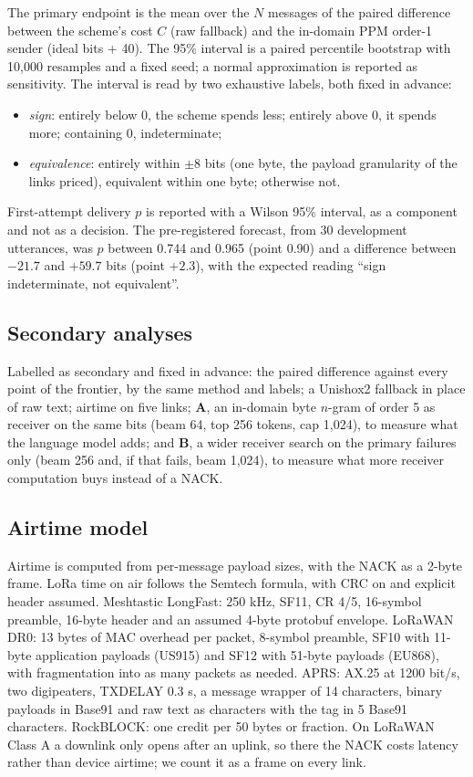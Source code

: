\documentclass[11pt]{article}
\begin{document}
The primary endpoint is the mean over the $N$ messages of the paired difference between the scheme's
cost $C$ (raw fallback) and the in-domain PPM order-1 sender (ideal bits + 40). The 95\% interval is
a paired percentile bootstrap with 10,000 resamples and a fixed seed; a normal approximation is
reported as sensitivity. The interval is read by two exhaustive labels, both fixed in advance:
\begin{itemize}
\item \emph{sign}: entirely below 0, the scheme spends less; entirely above 0, it spends more;
containing 0, indeterminate;
\item \emph{equivalence}: entirely within $\pm 8$ bits (one byte, the payload granularity of the
links priced), equivalent within one byte; otherwise not.
\end{itemize}
First-attempt delivery $p$ is reported with a Wilson 95\% interval, as a component and not as a
decision. The pre-registered forecast, from 30 development utterances, was $p$ between 0.744 and
0.965 (point 0.90) and a difference between $-21.7$ and $+59.7$ bits (point $+2.3$), with the
expected reading ``sign indeterminate, not equivalent''.

\subsection{Secondary analyses}\label{sec:secondary}

Labelled as secondary and fixed in advance: the paired difference against every point of the
frontier, by the same method and labels; a Unishox2 fallback in place of raw text; airtime on five
links; \textbf{A}, an in-domain byte $n$-gram of order 5 as receiver on the same bits (beam 64, top 256
tokens, cap 1,024), to measure what the language model adds; and \textbf{B}, a wider receiver search
on the primary failures only (beam 256 and, if that fails, beam 1,024), to measure what more receiver
computation buys instead of a NACK.

\subsection{Airtime model}

Airtime is computed from per-message payload sizes, with the NACK as a 2-byte frame. LoRa time on air
follows the Semtech formula, with CRC on and explicit header assumed. Meshtastic LongFast: 250 kHz,
SF11, CR 4/5, 16-symbol preamble, 16-byte header and an assumed 4-byte protobuf envelope. LoRaWAN DR0:
13 bytes of MAC overhead per packet, 8-symbol preamble, SF10 with 11-byte application payloads
(US915) and SF12 with 51-byte payloads (EU868), with fragmentation into as many packets as needed.
APRS: AX.25 at 1200 bit/s, two digipeaters, TXDELAY 0.3 s, a message wrapper of 14 characters, binary
payloads in Base91 and raw text as characters with the tag in 5 Base91 characters. RockBLOCK: one
credit per 50 bytes or fraction. On LoRaWAN Class A a downlink only opens after an uplink, so there
the NACK costs latency rather than device airtime; we count it as a frame on every link.
\end{document}
